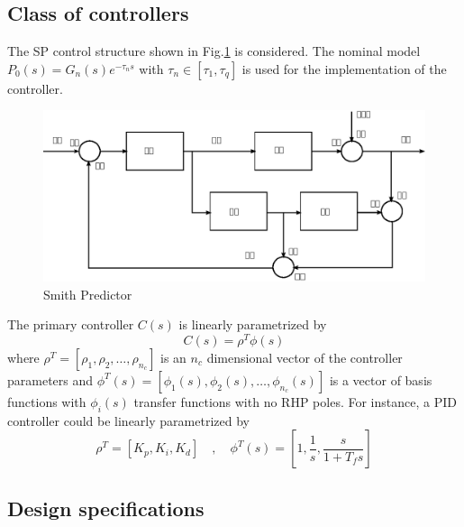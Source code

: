 \documentclass[default]{svmult}
\begin{document}
\subsection{Class of controllers} \label{sec:siso_cls}

The SP control structure shown in Fig.\ref{fig:dtc} is considered. The nominal model $P_0(s)=G_n(s)e^{-\tau_n s}$ with $\tau_n \in [\tau_1, \tau_q ]$ is used for the implementation of the controller.
\begin{figure}[h]
\centering
{}
\includegraphics[width=0.8\columnwidth]{fig/SISO_block.eps}
\caption{Smith Predictor}
\label{fig:dtc}
\end{figure}%

The primary controller $C(s)$ is linearly parametrized by
\begin{equation}\label{eq:controller}
C(s)= \rho^T \phi(s)
\end{equation}
 where 
$
 \rho^T=[\rho_1,\rho_2, \ldots, \rho_{n_c}] 
$
is an $n_c$ dimensional vector of the controller parameters and $\phi^T(s)=[\phi_1(s),\phi_2(s), \ldots, \phi_{n_c}(s)]$ is a vector of basis functions with $\phi_i(s)$ transfer functions with no RHP poles. For instance, a PID controller could be linearly parametrized by
$$\rho^T=[K_p,K_i, K_d] \quad , \quad  \phi^T(s)=[1, \frac{1}{s},\frac{s}{1+T_fs}] $$

\subsection{Design specifications}
\end{document}
